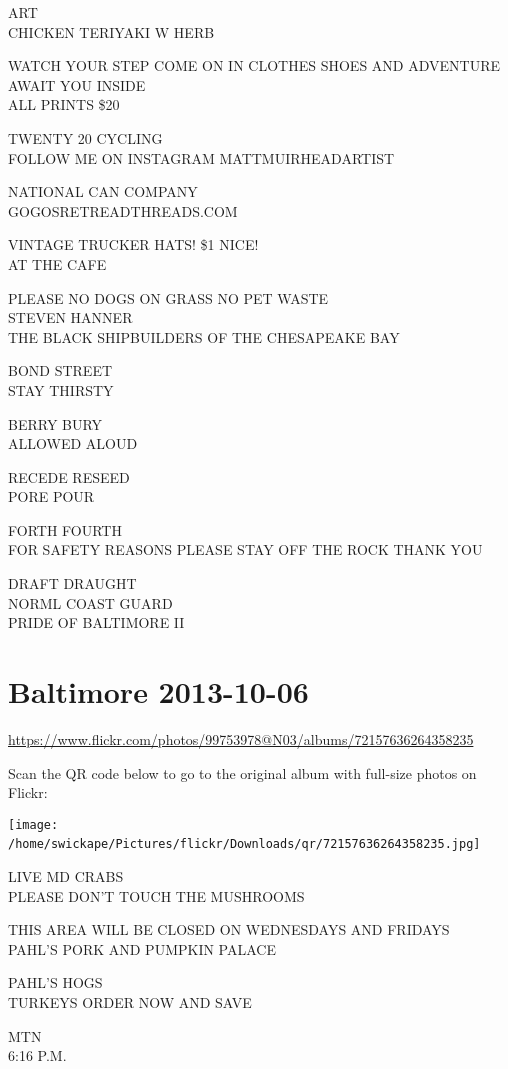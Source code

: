 \documentclass[10pt,letterpaper]{article}
\begin{document}
ART\\
CHICKEN TERIYAKI W HERB

WATCH YOUR STEP COME ON IN CLOTHES SHOES AND ADVENTURE AWAIT YOU INSIDE\\
ALL PRINTS \$20

TWENTY 20 CYCLING\\
FOLLOW ME ON INSTAGRAM MATTMUIRHEADARTIST

NATIONAL CAN COMPANY\\
GOGOSRETREADTHREADS.COM

VINTAGE TRUCKER HATS! \$1 NICE!\\
AT THE CAFE

PLEASE NO DOGS ON GRASS NO PET WASTE\\
STEVEN HANNER\\
THE BLACK SHIPBUILDERS OF THE CHESAPEAKE BAY

BOND STREET\\
STAY THIRSTY

BERRY BURY\\
ALLOWED ALOUD

RECEDE RESEED\\
PORE POUR

FORTH FOURTH\\
FOR SAFETY REASONS PLEASE STAY OFF THE ROCK THANK YOU

DRAFT DRAUGHT\\
NORML COAST GUARD\\
PRIDE OF BALTIMORE II
\

\section*{Baltimore 2013-10-06}

\url{https://www.flickr.com/photos/99753978@N03/albums/72157636264358235}

Scan the QR code below to go to the original album with full-size photos on Flickr:

\texttt{[image: /home/swickape/Pictures/flickr/Downloads/qr/72157636264358235.jpg]}
\

LIVE MD CRABS\\
PLEASE DON'T TOUCH THE MUSHROOMS

THIS AREA WILL BE CLOSED ON WEDNESDAYS AND FRIDAYS\\
PAHL'S PORK AND PUMPKIN PALACE

PAHL'S HOGS\\
TURKEYS ORDER NOW AND SAVE

MTN\\
6:16 P.M.
\end{document}

